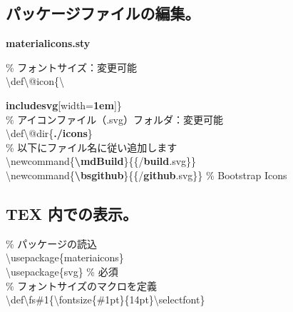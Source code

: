 \documentclass[a5j,10pt]{ltjarticle}
\def\fs#1{\fontsize{#1pt}{14pt}\selectfont}
\begin{document}
\subsection{パッケージファイルの編集。}
\textbf{materialicons.sty}\\  
{\fs{8}
\hspace{4mm}\% フォントサイズ：変更可能\vspace{1mm}\\
\hspace{4mm}\textbackslash def\textbackslash @icon\{\textbackslash{\textcolor{code}{\textbf{includesvg}}[width=\textbf{1em}]\}\vspace{2mm}\\
\hspace{4mm}\% アイコンファイル（.svg）フォルダ：変更可能\vspace{1mm}\\
\hspace{4mm}\textbackslash def\textbackslash @dir\{\textbf{./icons}\}\vspace{2mm}\\
\hspace{4mm}\% 以下にファイル名に従い追加します\vspace{1mm}\\
\hspace{4mm}\textbackslash newcommand\{\textcolor{code}{\textbf{\textbackslash mdBuild}}\}\{\textbackslash@icon\{\textbackslash@dir/\textcolor{code}{\textbf{build}}.svg\}\}\\
\hspace{4mm}\textbackslash newcommand\{\textcolor{code}{\textbf{\textbackslash bsgithub}}\}\{\textbackslash@icon\{\textbackslash@dir/\textcolor{code}{\textbf{github}}.svg\}\} \% Bootstrap Icons

}


\subsection{TEX 内での表示。}
\% パッケージの読込\\
\hspace{4mm}\textbackslash usepackage\{materiaicons\}\\
\hspace{4mm}\textbackslash usepackage\{svg\} \% 必須\\

\% フォントサイズのマクロを定義\\
\hspace{4mm}\textbackslash def\textbackslash fs\#1\{\textbackslash fontsize\{\#1pt\}\{14pt\}\textbackslash selectfont\}
  
}
\end{document}
